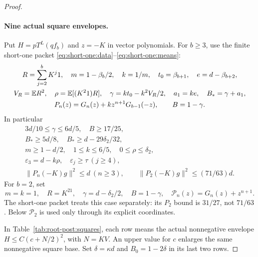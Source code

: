 \begin{proof}
\paragraph{Nine actual square envelopes.}\label{part:root-post:base-squares}
Put \(H=pT^L(qf_b)\) and \(z=-K\) in vector polynomials.
For \(b\ge3\), use the finite short-one packet
\eqref{eq:short-one:data}--\eqref{eq:short-one:means}:
\[
 \begin{gathered}
 R=\sum_{j=2}^bK^j1,\quad m=1-\beta_b/2,\quad k=1/m,\quad
 t_0=\beta_{b+1},\quad e=d-\beta_{b+2},\\
 V_R=\mathbb E R^2,\quad\rho=\mathbb E[(K^21)R],\quad
 \gamma=kt_0-k^2V_R/2,\quad a_1=ke,\quad B_*= \gamma+a_1,\\
 P_n(z)=G_n(z)+kz^{n+1}G_{b-1}(-z),\qquad B=1-\gamma.
 \end{gathered}
\]
In particular
\[
 \begin{gathered}
 3d/10\le\gamma\le6d/5,\quad B\ge17/25,\\
 B_*\ge5d/8,\quad B_*\ge d-29\delta_2/32,\\
 m\ge1-d/2,\quad1\le k\le6/5,\quad 0\le\rho\le\delta_2,\\
 \varepsilon_3=d-k\rho,\quad\varepsilon_j\ge\tau\ (j\ge4),\\
 \|P_n(-K)g\|^2\le d\ (n\ge3),\qquad
 \|P_2(-K)g\|^2\le(71/63)d .
 \end{gathered}
\]
For \(b=2\), set
\[
 m=k=1,\quad R=K^21,\quad
 \gamma=d-\delta_2/2,\quad B=1-\gamma,\quad
 \mathcal P_n(z)=G_n(z)+z^{n+1}.
\]
The short-one packet treats this case separately: its \(P_2\) bound
is \(31/27\), not \(71/63\). Below \(\mathcal P_2\) is used only
through its explicit coordinates.

In Table~\ref{tab:root-post:squares}, each row means the actual
nonnegative envelope \(H\le C(c+N/2)^2\), with \(N=KV\).
An upper value for \(c\) enlarges the same nonnegative square base.
Set \(\delta=\kappa d\) and \(B_0=1-2\delta\) in its last two rows.


\end{proof}
